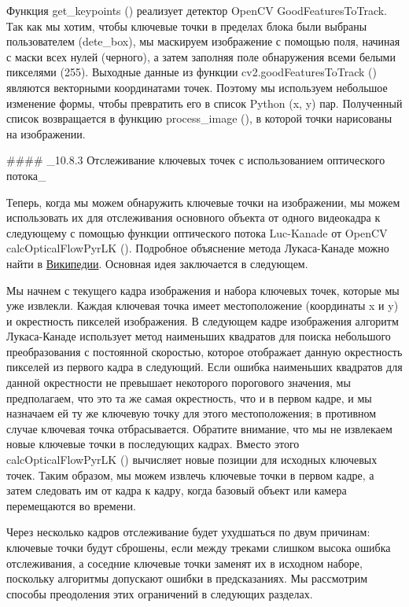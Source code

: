 Функция get\_keypoints () реализует детектор OpenCV GoodFeaturesToTrack. Так как мы хотим, чтобы ключевые точки в пределах блока были выбраны пользователем (dete\_box), мы маскируем изображение с помощью поля, начиная с маски всех нулей (черного), а затем заполняя поле обнаружения всеми белыми пикселями (255). Выходные данные из функции cv2.goodFeaturesToTrack () являются векторными координатами точек. Поэтому мы используем небольшое изменение формы, чтобы превратить его в список Python (x, y) пар. Полученный список возвращается в функцию process\_image (), в которой точки нарисованы на изображении.

#### _10.8.3 Отслеживание ключевых точек с использованием оптического потока_

Теперь, когда мы можем обнаружить ключевые точки на изображении, мы можем использовать их для отслеживания основного объекта от одного видеокадра к следующему с помощью функции оптического потока Luc-Kanade от OpenCV calcOpticalFlowPyrLK (). Подробное объяснение метода Лукаса-Канаде можно найти в \href{http://en.wikipedia.org/wiki/Lucas%E2%80%93Kanade_method}{Википедии}. Основная идея заключается в следующем.

Мы начнем с текущего кадра изображения и набора ключевых точек, которые мы уже извлекли. Каждая ключевая точка имеет местоположение (координаты x и y) и окрестность пикселей изображения. В следующем кадре изображения алгоритм Лукаса-Канаде использует метод наименьших квадратов для поиска небольшого преобразования с постоянной скоростью, которое отображает данную окрестность пикселей из первого кадра в следующий. Если ошибка наименьших квадратов для данной окрестности не превышает некоторого порогового значения, мы предполагаем, что это та же самая окрестность, что и в первом кадре, и мы назначаем ей ту же ключевую точку для этого местоположения; в противном случае ключевая точка отбрасывается. Обратите внимание, что мы не извлекаем новые ключевые точки в последующих кадрах. Вместо этого calcOpticalFlowPyrLK () вычисляет новые позиции для исходных ключевых точек. Таким образом, мы можем извлечь ключевые точки в первом кадре, а затем следовать им от кадра к кадру, когда базовый объект или камера перемещаются во времени.

Через несколько кадров отслеживание будет ухудшаться по двум причинам: ключевые точки будут сброшены, если между треками слишком высока ошибка отслеживания, а соседние ключевые точки заменят их в исходном наборе, поскольку алгоритмы допускают ошибки в предсказаниях. Мы рассмотрим способы преодоления этих ограничений в следующих разделах.

